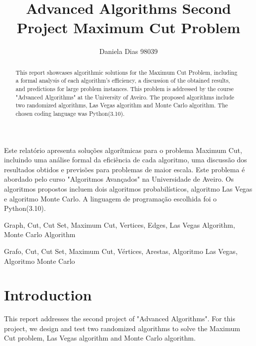 \documentclass[]{revdetua}
\begin{document}

\title{Advanced Algorithms Second Project \linebreak Maximum Cut Problem}
\author{Daniela Dias 98039}
\maketitle

\begin{abstract}
This report showcases algorithmic solutions for the Maximum Cut Problem, including a formal analysis of each algorithm's efficiency, a discussion of the obtained results, and predictions for large problem instances. This problem is addressed by the course "Advanced Algorithms" at the University of Aveiro. The proposed algorithms include two randomized algorithms, Las Vegas algorithm and Monte Carlo algorithm. The chosen coding language was Python(3.10).
\end{abstract}

\begin{resumo}
Este relatório apresenta soluções algorítmicas para o problema Maximum Cut, incluindo uma análise formal da eficiência de cada algoritmo, uma discussão dos resultados obtidos e previsões para problemas de maior escala. Este problema é abordado pelo curso "Algoritmos Avançados" na Universidade de Aveiro. Os algoritmos propostos incluem dois algoritmos probabilísticos, algoritmo Las Vegas e algoritmo Monte Carlo. A linguagem de programação escolhida foi o Python(3.10).
\end{resumo}

\begin{keywords}%
Graph, Cut, Cut Set, Maximum Cut, Vertices, Edges, Las Vegas Algorithm, Monte Carlo Algorithm
\end{keywords}

\begin{palavraschave}%
Grafo, Cut, Cut Set, Maximum Cut, Vértices, Arestas, Algoritmo Las Vegas, Algoritmo Monte Carlo
\end{palavraschave}

\section{Introduction}
This report addresses the second project of "Advanced Algorithms". For this project, we design and test two randomized algorithms to solve the Maximum Cut problem, Las Vegas algorithm and Monte Carlo algorithm.
\end{document}
